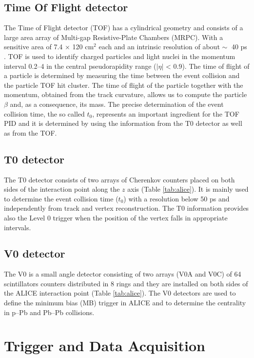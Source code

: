 %
\subsection{Time Of Flight detector} \label{sec:tof}

The Time of Flight detector (TOF) has a cylindrical geometry and consists of a large area array of 
Multi-gap Resistive-Plate Chambers (MRPC).
With a sensitive area of 7.4 × 120 cm$^2$ each and an intrinsic resolution of about $\sim\;$ 40 ps 
\cite{alicemulti}. TOF is used to identify charged particles and light nuclei in the momentum interval 
0.2--4 \gevc in the central pseudorapidity range ($|\eta|$ < 0.9).
The time of flight of a particle is determined by measuring the time between the event collision and the
particle TOF hit cluster. 
The time of flight of the particle together with the momentum, obtained from the track curvature, 
allows us to compute the particle $\beta$ and, as a consequence, its mass.
The precise determination of the event collision time, the so called $t_{0}$, represents an important
ingredient for the TOF PID and it is determined by using the information from the T0 detector as 
well as from the TOF. 

%
\subsection{T0 detector} \label{sec:t0}

The T0 detector consists of two arrays of Cherenkov counters placed on both sides of the interaction point 
along the $z$ axis (Table \ref{tab:alice}).
It is mainly used to determine the event collision time ($t_{0}$) with a resolution below 50 ps
and  independently from track and vertex reconstruction. 
The T0 information provides also the Level 0 trigger when the position of the vertex falls in
appropriate intervals.

%
\subsection{V0 detector} \label{sec:v0}

The V0 is a small angle detector consisting of two arrays (V0A and V0C) of 64 scintillators counters 
distributed in 8 rings and they are installed on both sides of the ALICE interaction point 
(Table \ref{tab:alice}). 
The V0 detectors are used to define the minimum bias (MB) trigger in ALICE and to determine the
centrality in p–Pb and Pb–Pb collisions.

%
%
\section{Trigger and Data Acquisition} \label{sec:data_flow}

